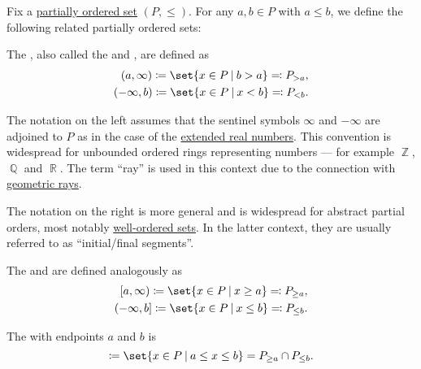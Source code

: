 \begin{definition}\label{def:order_interval}
  Fix a \hyperref[def:partially_ordered_set]{partially ordered set} \( (P, \leq) \). For any \( a, b \in P \) with \( a \leq b \), we define the following related partially ordered sets:

  \begin{thmenum}
     The , also called the  and , are defined as
    \begin{equation*}
      \begin{aligned}
        (a, \infty) \coloneqq \set{ x \in P \given b > a } \eqqcolon P_{>a},
        \\
        (-\infty, b) \coloneqq \set{ x \in P \given x < b } \eqqcolon P_{<b}.
      \end{aligned}
    \end{equation*}

    The notation on the left assumes that the sentinel symbols \( \infty \) and \( -\infty \) are adjoined to \( P \) as in the case of the \hyperref[def:extended_real_numbers]{extended real numbers}. This convention is widespread for unbounded ordered rings representing numbers --- for example \hyperref[def:integers]{\( \BbbZ \)}, \hyperref[def:rational_numbers]{\( \BbbQ \)} and \hyperref[def:real_numbers]{\( \BbbR \)}. The term \enquote{ray} is used in this context due to the connection with \hyperref[def:geometric_ray]{geometric rays}.

    The notation on the right is more general and is widespread for abstract partial orders, most notably \hyperref[def:well_ordered_set]{well-ordered sets}. In the latter context, they are usually referred to as \enquote{initial/final segments}.

    The  and  are defined analogously as
    \begin{equation*}
      \begin{aligned}
        [a, \infty) \coloneqq \set{ x \in P \given x \geq a } \eqqcolon P_{\geq a},
        \\
        (-\infty, b] \coloneqq \set{ x \in P \given x \leq b } \eqqcolon P_{\leq b}.
      \end{aligned}
    \end{equation*}

     The  with endpoints \( a \) and \( b \) is
    \begin{equation*}
      [a, b] \coloneqq \set{ x \in P \given a \leq x \leq b } = P_{\geq a} \cap P_{\leq b}.
    \end{equation*}


\end{thmenum}
\end{definition}
